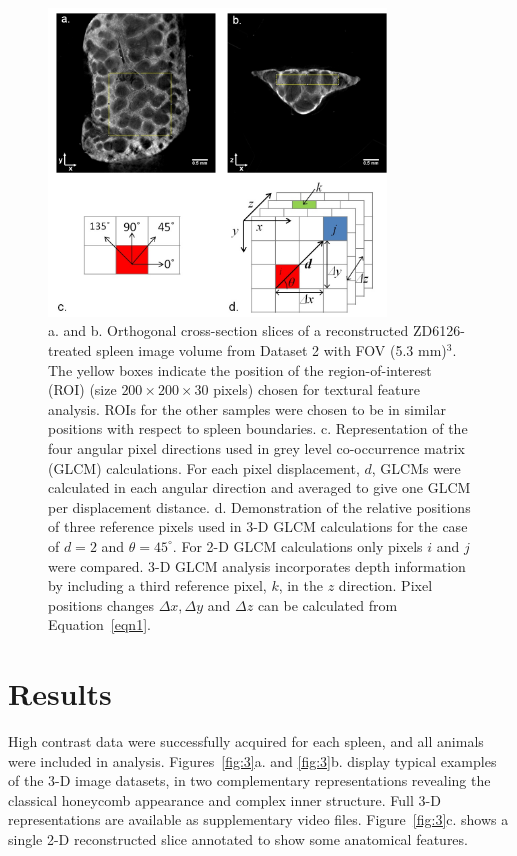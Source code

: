 	
	\begin{figure}%
		\centering
		\includegraphics[width=0.8\textwidth]{spleen_img/spleen_Figure2.jpg}
		\caption{a. and b. Orthogonal cross-section slices of a reconstructed ZD6126-treated spleen image volume from Dataset 2 with FOV (5.3 mm)$^3$. The yellow boxes indicate the position of the region-of-interest (ROI) (size $200 \times 200 \times 30$ pixels) chosen for textural feature analysis. ROIs for the other samples were chosen to be in similar positions with respect to spleen boundaries. c. Representation of the four angular pixel directions used in grey level co-occurrence matrix (GLCM) calculations. For each pixel displacement, $d$, GLCMs were calculated in each angular direction and averaged to give one GLCM per displacement distance. d. Demonstration of the relative positions of three reference pixels used in 3-D GLCM calculations for the case of $d = 2$ and $\theta=45^{\circ}$. For 2-D GLCM calculations only pixels $i$ and $j$ were compared. 3-D GLCM analysis incorporates depth information by including a third reference pixel, $k$, in the $z$ direction. Pixel positions changes  $\Delta x, \Delta y$  and $\Delta z$  can be calculated from Equation~\ref{eqn1}.}
		\label{fig:2}
	\end{figure}
	
	
	
	
	
	\section{Results}
	High contrast data were successfully acquired for each spleen, and all animals were included in analysis. Figures~\ref{fig:3}a. and \ref{fig:3}b. display typical examples of the 3-D image datasets, in two complementary representations revealing the classical honeycomb appearance and complex inner structure. Full 3-D representations are available as supplementary video files. Figure~\ref{fig:3}c. shows a single 2-D reconstructed slice annotated to show some anatomical features. 
	
